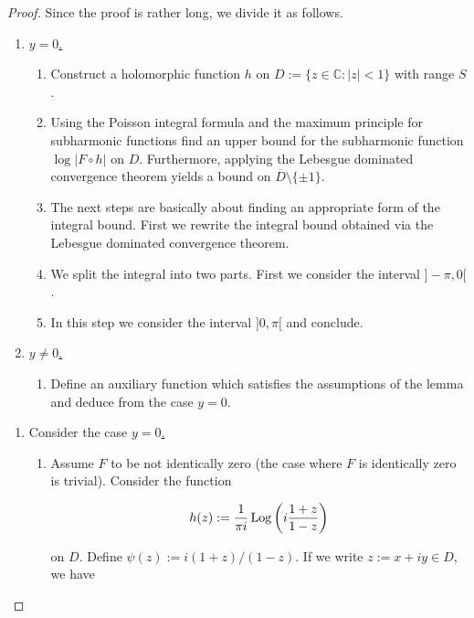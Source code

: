 \begin{proof}
Since the proof is rather long, we divide it as follows.

\begin{enumerate}[label = \textbf{(\roman*)}]
	\item \underline{$y = 0$.}
		\begin{enumerate}[label = \textbf{\alph*.}]
			\item Construct a holomorphic function $h$ on $D := \{z \in \mathbb{C} : \vert z \vert < 1\}$ with range $S$.
			\item Using the Poisson integral formula and the maximum principle for subharmonic functions find an upper bound for the subharmonic function $\log\vert F \circ h\vert$ on $D$. Furthermore, applying the Lebesgue dominated convergence theorem yields a bound on $\overline{D} \setminus \{\pm 1\}$.
			\item The next steps are basically about finding an appropriate form of the integral bound. First we rewrite the integral bound obtained via the Lebesgue dominated convergence theorem.
			\item We split the integral into two parts. First we consider the interval $]-\pi,0[$.
			\item In this step we consider the interval $]0,\pi[$ and conclude.
		\end{enumerate}
	\item \underline{$y \neq 0$.}
		\begin{enumerate}[label = \textbf{\alph*.}]
			\item Define an auxiliary function which satisfies the assumptions of the lemma and deduce from the case $y = 0$.
		\end{enumerate}
\end{enumerate}

\begin{enumerate}[label = \textbf{(\roman*)}]
	\item Consider the case \underline{$y = 0$.}
	\begin{enumerate}[label = \textbf{\alph*.}]
	\item Assume $F$ to be not identically zero (the case where $F$ is identically zero is trivial). Consider the function 

	\begin{equation}
		h(z) := \frac{1}{\pi i}\operatorname{Log}\left( i\frac{1 + z}{1 - z} \right)
	\end{equation}

	on $D$. Define $\psi(z) := i(1 + z)/(1 - z)$. If we write $z := x + iy \in D$, we have 


\end{enumerate}
\end{enumerate}
\end{proof}
